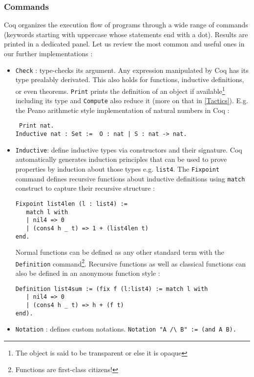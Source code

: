 \documentclass{article}
\begin{document}
        \subsubsection{Commands}
        Coq organizes the execution flow of programs through a wide range of commands (keywords starting with uppercase whose statements end with a dot). Results are printed in a dedicated panel. Let us review the most common and useful ones in our further implementations :
        \begin{itemize}
            \item \texttt{Check} : type-checks its argument. Any expression manipulated by Coq has its type prealably derivated. This also holds for functions, inductive definitions, or even theorems. \texttt{Print} prints the definition of an object if available\footnote{The object is said to be transparent or else it is opaque} including its type and \texttt{Compute} also reduce it (more on that in \ref{Tactics}). E.g. the Peano arithmetic style implementation of natural numbers in Coq :
            \begin{verbatim} Print nat.
Inductive nat : Set :=  O : nat | S : nat -> nat. \end{verbatim}
            \item  \texttt{Inductive}: define inductive types via constructors and their signature. Coq automatically generates induction principles that can be used to prove properties by induction about those types e.g. \texttt{list4}.
            The \texttt{Fixpoint} command defines recursive functions about inductive definitions using \texttt{match} construct to capture their recursive structure :
            \begin{verbatim}
Fixpoint list4len (l : list4) :=
   match l with
   | nil4 => 0
   | (cons4 h _ t) => 1 + (list4len t)
end.\end{verbatim}
            Normal functions can be defined as any other standard term with the \texttt{Definition} command\footnote{Functions are first-class citizens!}. Recursive functions as well as classical functions can also be defined in an anonymous function style :
            \begin{verbatim}Definition list4sum := (fix f (l:list4) := match l with
   | nil4 => 0
   | (cons4 h _ t) => h + (f t)
end).\end{verbatim}

            \item \texttt{Notation} : defines custom notations. \verb|Notation "A /\ B" := (and A B).|


\end{itemize}
\end{document}

